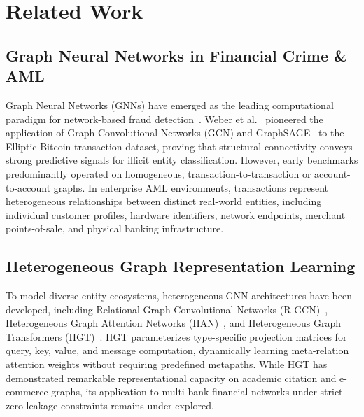 \documentclass[conference]{IEEEtran}
\begin{document}
\section{Related Work}
\label{sec:related}

\subsection{Graph Neural Networks in Financial Crime \& AML}
Graph Neural Networks (GNNs) have emerged as the leading computational paradigm for network-based fraud detection~\cite{weber2019anti,savage2016anomaly,dou2020enhancing}. Weber et al.~\cite{weber2019anti} pioneered the application of Graph Convolutional Networks (GCN) and GraphSAGE~\cite{hamilton2017inductive} to the Elliptic Bitcoin transaction dataset, proving that structural connectivity conveys strong predictive signals for illicit entity classification. However, early benchmarks predominantly operated on homogeneous, transaction-to-transaction or account-to-account graphs. In enterprise AML environments, transactions represent heterogeneous relationships between distinct real-world entities, including individual customer profiles, hardware identifiers, network endpoints, merchant points-of-sale, and physical banking infrastructure.

\subsection{Heterogeneous Graph Representation Learning}
To model diverse entity ecosystems, heterogeneous GNN architectures have been developed, including Relational Graph Convolutional Networks (R-GCN)~\cite{schlichtkrull2018modeling}, Heterogeneous Graph Attention Networks (HAN)~\cite{wang2019heterogeneous}, and Heterogeneous Graph Transformers (HGT)~\cite{hu2020heterogeneous}. HGT parameterizes type-specific projection matrices for query, key, value, and message computation, dynamically learning meta-relation attention weights without requiring predefined metapaths. While HGT has demonstrated remarkable representational capacity on academic citation and e-commerce graphs, its application to multi-bank financial networks under strict zero-leakage constraints remains under-explored.
\end{document}
